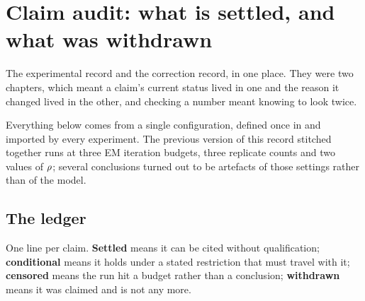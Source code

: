 \chapter{Claim audit: what is settled, and what was withdrawn}
\label{ch:status}
\label{ch:corrections}

The experimental record and the correction record, in one place. They were two
chapters, which meant a claim's current status lived in one and the reason it
changed lived in the other, and checking a number meant knowing to look twice.

Everything below comes from a single configuration, defined once in
 and imported by every experiment. The
previous version of this record stitched together runs at three EM iteration
budgets, three replicate counts and two values of $\rho$; several conclusions
turned out to be artefacts of those settings rather than of the model.

\section*{The ledger}

One line per claim. \textbf{Settled} means it can be cited without qualification;
\textbf{conditional} means it holds under a stated restriction that must travel
with it; \textbf{censored} means the run hit a budget rather than a conclusion;
\textbf{withdrawn} means it was claimed and is not any more.

